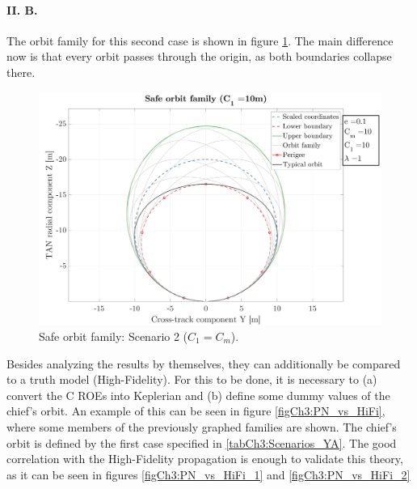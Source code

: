 		\paragraph{\textcolor{GMVred}{II. B.}  \\}		
		\indent The orbit family for this second case is shown in figure \ref{figCh3:Safe_orbit_2}. The main difference now is that every orbit passes through the origin, as both boundaries collapse there.
		\begin{figure}[!htb]
		\centering\includegraphics[width = \linewidth]{Chapters/Chapter_03/High_quality/Safe_orbit_C1_10}
		\caption{Safe orbit family: Scenario 2 ($C_1 = C_m$).}
		\label{figCh3:Safe_orbit_2}
		\end{figure}
		\FloatBarrier
		\indent Besides analyzing the results by themselves, they can additionally be compared to a truth model (High-Fidelity). For this to be done, it is necessary to (a) convert the C ROEs into Keplerian and (b) define some dummy values of the chief's orbit. An example of this can be seen in figure \ref{figCh3:PN_vs_HiFi}, where some members of the previously graphed families are shown. The chief's orbit is defined by the first case specified in \ref{tabCh3:Scenarios_YA}. The good correlation with the High-Fidelity propagation is enough to validate this theory, as it can be seen in figures \ref{figCh3:PN_vs_HiFi_1} and \ref{figCh3:PN_vs_HiFi_2}
